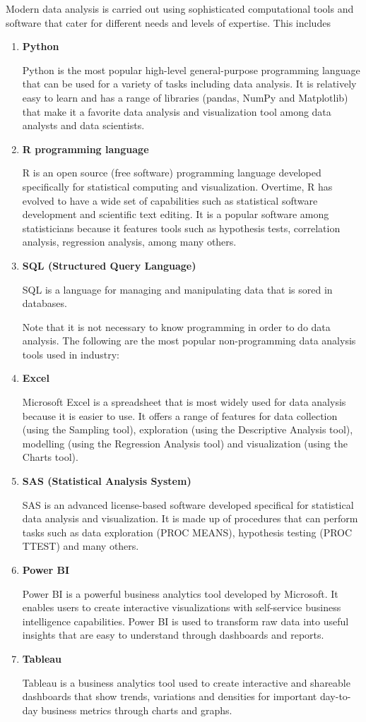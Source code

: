 \documentclass[
]{book}
\begin{document}
Modern data analysis is carried out using sophisticated computational tools and software that cater for different needs and levels of expertise. This includes

\begin{enumerate}
\def\labelenumi{\arabic{enumi}.}
\item
  \textbf{Python}

  Python is the most popular high-level general-purpose programming language that can be used for a variety of tasks including data analysis. It is relatively easy to learn and has a range of libraries (pandas, NumPy and Matplotlib) that make it a favorite data analysis and visualization tool among data analysts and data scientists.
\item
  \textbf{R programming language}

  R is an open source (free software) programming language developed specifically for statistical computing and visualization. Overtime, R has evolved to have a wide set of capabilities such as statistical software development and scientific text editing. It is a popular software among statisticians because it features tools such as hypothesis tests, correlation analysis, regression analysis, among many others. ~
\item
  \textbf{SQL (Structured Query Language)}

  SQL is a language for managing and manipulating data that is sored in databases.

  Note that it is not necessary to know programming in order to do data analysis. The following are the most popular non-programming data analysis tools used in industry:
\item
  \textbf{Excel}

  Microsoft Excel is a spreadsheet that is most widely used for data analysis because it is easier to use. It offers a range of features for data collection (using the Sampling tool), exploration (using the Descriptive Analysis tool), modelling (using the Regression Analysis tool) and visualization (using the Charts tool).
\item
  \textbf{SAS (Statistical Analysis System)}

  SAS is an advanced license-based software developed specifical for statistical data analysis and visualization. It is made up of procedures that can perform tasks such as data exploration (PROC MEANS), hypothesis testing (PROC TTEST) and many others.
\item
  \textbf{Power BI}

  Power BI is a powerful business analytics tool developed by Microsoft. It enables users to create interactive visualizations with self-service business intelligence capabilities. Power BI is used to transform raw data into useful insights that are easy to understand through dashboards and reports.
\item
  \textbf{Tableau}

  Tableau is a business analytics tool used to create interactive and shareable dashboards that show trends, variations and densities for important day-to-day business metrics through charts and graphs.
\end{enumerate}
\end{document}

